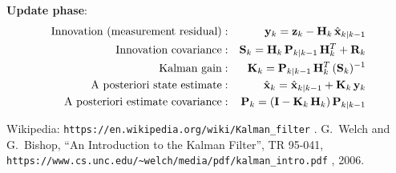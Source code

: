 \documentclass[]{article}
\begin{document}
\noindent\textbf{Update phase}:
\begin{eqnarray}
\mbox{Innovation (measurement residual)} &:& {{\bf y}_{k}} = {{\bf z}_{k}} - {{\bf H}_{k}}\,{{\hat{\bf x}}_{k|k-1}} \\
\mbox{Innovation covariance} &:& {{\bf S}_{k}} = {{\bf H}_{k}}\,{{\bf P}_{k|k-1}}\,{{\bf H}_{k}^T} + {{\bf R}_{k}} \\
\mbox{Kalman gain} &:& {{\bf K}_{k}} = {{\bf P}_{k|k-1}}\,{{\bf H}_{k}^T}\,({{\bf S}_{k}})^{-1} \\
\mbox{A posteriori state estimate} &:& {{\hat{\bf x}}_{k}} = {{\hat{\bf x}}_{k|k-1}} + {{\bf K}_{k}}\,{{\bf y}_{k}} \\
\mbox{A posteriori estimate covariance} &:& {{\bf P}_{k}} = ({\bf I} - {{\bf K}_{k}}\,{{\bf H}_{k}})\,{{\bf P}_{k|k-1}}
\end{eqnarray}

\begin{thebibliography}{1}
 Wikipedia: \verb|https://en.wikipedia.org/wiki/Kalman_filter|\,\,.
  G.~Welch and G.~Bishop, ``An Introduction to the Kalman Filter'', TR 95-041, \verb|https://www.cs.unc.edu/~welch/media/pdf/kalman_intro.pdf|\,\,, 2006.
\end{thebibliography}
\end{document}
